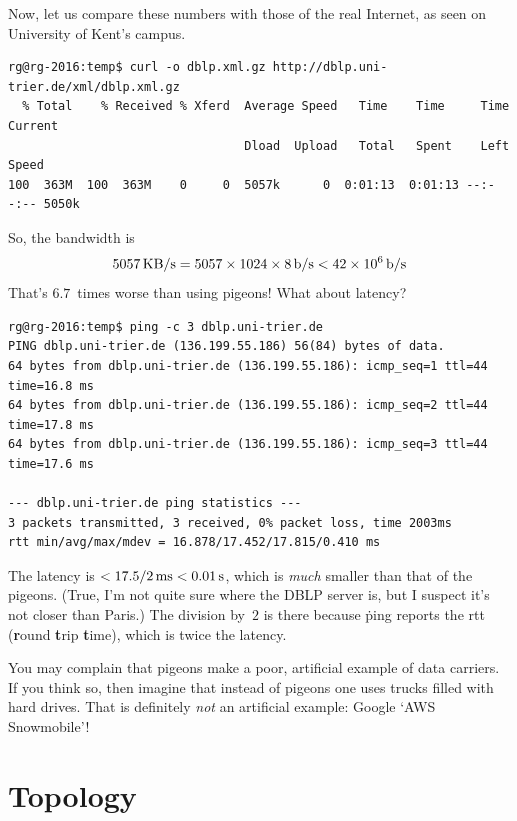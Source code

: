 Now, let us compare these numbers with those of the real Internet,
  as seen on University of Kent's campus.
\begin{verbatim}
rg@rg-2016:temp$ curl -o dblp.xml.gz http://dblp.uni-trier.de/xml/dblp.xml.gz
  % Total    % Received % Xferd  Average Speed   Time    Time     Time  Current
                                 Dload  Upload   Total   Spent    Left  Speed
100  363M  100  363M    0     0  5057k      0  0:01:13  0:01:13 --:--:-- 5050k
\end{verbatim}
So, the bandwidth is
\[
  5057\,{\rm KB}/{\rm s} = 5057\times1024\times8\,{\rm b}/{\rm s}
    < 42\times10^6\,{\rm b}/{\rm s}
\]
That's $6.7$~times worse than using pigeons!
What about latency?
\begin{verbatim}
rg@rg-2016:temp$ ping -c 3 dblp.uni-trier.de
PING dblp.uni-trier.de (136.199.55.186) 56(84) bytes of data.
64 bytes from dblp.uni-trier.de (136.199.55.186): icmp_seq=1 ttl=44 time=16.8 ms
64 bytes from dblp.uni-trier.de (136.199.55.186): icmp_seq=2 ttl=44 time=17.8 ms
64 bytes from dblp.uni-trier.de (136.199.55.186): icmp_seq=3 ttl=44 time=17.6 ms

--- dblp.uni-trier.de ping statistics ---
3 packets transmitted, 3 received, 0% packet loss, time 2003ms
rtt min/avg/max/mdev = 16.878/17.452/17.815/0.410 ms
\end{verbatim}
The latency is $<17.5/2\,{\rm ms}<0.01\,{\rm s}$,
  which is \emph{much} smaller than that of the pigeons.
(True, I'm not quite sure where the DBLP server is,
  but I suspect it's not closer than Paris.)
The division by~$2$ is there because \.{ping} reports
  the rtt ({\bf r}ound {\bf t}rip {\bf t}ime),
  which is twice the latency.

You may complain that pigeons make a poor, artificial example of data carriers.
If you think so,
  then imagine that instead of pigeons one uses trucks filled with hard drives.
That is definitely \emph{not} an artificial example:
  Google `AWS Snowmobile'!


\section*{Topology}

